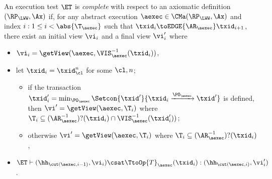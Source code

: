 \begin{definition}
\label{def:et_complete}
An execution test $\ET$ is \emph{complete} with respect 
to an axiomatic definition $(\RP_{\LWW}, \Ax)$ if, for any abstract execution $\aexec \in \CMa(\RP_{\LWW}, \Ax)$ 
and index \( i : 1 \leq i < \abs{\T_{\aexec}}\) such that \( \txid_{i} \toEDGE{\AR_{\aexec}} \txid_{i+1} \), there exist an initial view $\vi_{i}$ and a final view $\vi_{i}'$ where 
\begin{itemize}
\item $\vi_{i} = \getView(\aexec, \VIS_{\aexec}^{-1}(\txid_{i}))$, 
\item let $\txid_{i} = \txid_{\cl}^{n}$ for some $\cl, n$; 
    \begin{itemize}
        \item if the transaction $\txid_{i}' = \min_{\PO_{\aexec}}\Setcon{\txid' }{ \txid_i \xrightarrow{\PO_{\aexec}} \txid'}$ is defined, then $\vi' = \getView(\aexec, \T_{i})$ where $\T_{i} \subseteq (\AR_{\aexec}^{-1})?(\txid_{i}) \cap \VIS_{\aexec}^{-1}(\txid_{i}'))$; 
        \item otherwise $\vi' = \getView(\aexec, \T_{i})$ where $\T_{i} \subseteq (\AR_{\aexec}^{-1})?(\txid_{i})$, 
    \end{itemize}
\item $\ET \vdash (\hh_{\cut(\aexec, i-1)}, \vi_{i}) \csat \TtoOp{T}_{\aexec}(\txid_{i}) : (\hh_{\cut(\aexec, i)},\vi_{i}')$.
\end{itemize}
\end{definition}


